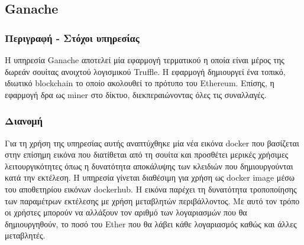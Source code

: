 \subsection{Ganache} \label{subsection:4-3-6-ganache-service}

\subsubsection{Περιγραφή - Στόχοι υπηρεσίας}

Η υπηρεσία Ganache αποτελεί μία εφαρμογή τερματικού η οποία είναι μέρος της δωρεάν σουίτας ανοιχτού λογισμικού Truffle. Η εφαρμογή δημιουργεί ένα τοπικό, ιδιωτικό blockchain το οποίο ακολουθεί το πρότυπο του Ethereum. Επίσης, η εφαρμογή δρα ως miner στο δίκτυο, διεκπεραιώνοντας όλες τις συναλλαγές.

\subsubsection{Διανομή}

Για τη χρήση της υπηρεσίας αυτής αναπτύχθηκε μία νέα εικόνα docker που βασίζεται στην επίσημη εικόνα που διατίθεται από τη σουίτα και προσθέτει μερικές χρήσιμες λειτουργικότητες όπως η δυνατότητα αποκάλυψης των κλειδιών που δημιουργούνται κατά την εκτέλεση. Η υπηρεσία γίνεται διαθέσιμη για χρήση ως docker image μέσω του αποθετηρίου εικόνων dockerhub. Η εικόνα παρέχει τη δυνατότητα τροποποίησης των παραμέτρων εκτέλεσης με χρήση μεταβλητών περιβάλλοντος. Με αυτό τον τρόπο οι χρήστες μπορούν να αλλάξουν τον αριθμό των λογαριασμών που θα δημιουργηθούν, το ποσό του Ether που θα λάβει κάθε λογαριασμός καθώς και άλλες μεταβλητές.